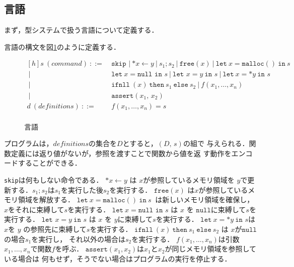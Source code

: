 \subsection{言語}
まず，型システムで扱う言語について定義する．

\begin{definition}[言語]
言語の構文を図\ref{syntax}のように定義する．
\end{definition}
  \begin{figure}[h]
    \centering
    \fbox
    {$
    \begin{aligned}[h]
      s\ (\mathit{command})\ ::=
      \ & \texttt{skip\ }|\ \mathit{*x} \leftarrow y \ |\ s_1;s_2\ |
      \ \texttt{free} (x)
      \ |\ \texttt{let}\ x = \texttt{malloc}()\ \texttt{in}\ s\ \\[-3pt]
      \ |\ &\texttt{let}\ x = \texttt{null\ in\ }s \ |
      \ \texttt{let\ } x = y \ \texttt{in\ } s \ |
      \ \texttt{let} \ x = \mathit{*y} \ \texttt{in\ } s \\[-3pt]
      \ |\ &\texttt{ifnll}\ (x)\ \texttt{then}\ s_1 \ \texttt{else}\ s_2\ |
      \ f(x_1, \dots ,x_n) \\[-3pt]
      \ |\ &\texttt{assert}(x_1,\,x_2) \\[-3pt]
      d\ (\mathit{definitions})\ ::=
      \ & f(x_1,\dots,x_n) = s \\
    \end{aligned}
    $}
    \caption{言語}
    \label{syntax}
  \end{figure}

プログラムは，$\mathit{definitions}$の集合を$D$とすると，$(D,\,s)$の組で
与えられる．関数定義には返り値がないが，参照を渡すことで関数から値を返
す動作をエンコードすることができる．

\texttt{skip}は何もしない命令である．
$\mathit{*x} \leftarrow y$ は $\mathit{x}$が参照しているメモリ領域を
$\mathit{y}$で更新する．$s_1;s_2$は$s_1$を実行した後$s_2$を実行する．
$\texttt{free} (x)$ は$\mathit{x}$が参照しているメモリ領域を解放する．
$\texttt{let}\ x = \texttt{malloc}()\ \texttt{in}\ s\ $
は新しいメモリ領域を確保し，$\mathit{x}$をそれに束縛して$s$を実行する．
$\texttt{let}\ x = \texttt{null\ in\ }s $ は $\mathit{x}$ を
$\texttt{null}$に束縛して$s$を実行する．
$\texttt{let\ } x = y \ \texttt{in\ } s $ は $\mathit{x}$ を
$y$に束縛して$s$を実行する．
$\texttt{let} \ x = \mathit{*y} \ \texttt{in\ } s$は$\mathit{x}$を
$\mathit{y}$ の参照先に束縛して$s$を実行する．
$\texttt{ifnll}\ (x)\ \texttt{then}\ s_1 \ \texttt{else}\ s_2$ は
$\mathit{x}$が$\texttt{null}$の場合$s_1$を実行し，
それ以外の場合は$s_2$を実行する．
$f(x_1, \dots, x_n)$は引数$x_1, \dots, x_n$で関数$f$を呼ぶ．
$\texttt{assert}(x_1,x_2)$は$x_1$と$x_2$が同じメモリ領域を参照している場合は
何もせず，そうでない場合はプログラムの実行を停止する．


